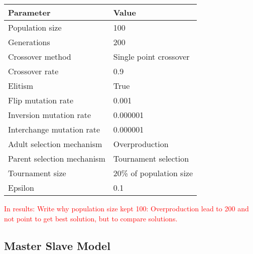 \begin{table}
\centering
\begin{tabular}{l|l}
\textbf{Parameter} & \textbf{Value} \\ 
\hline 
Population size & 100 \\  
Generations & 200 \\ 
Crossover method & Single point crossover \\ 
Crossover rate & 0.9 \\ 
Elitism & True \\ 
Flip mutation rate & 0.001 \\ 
Inversion mutation rate & 0.000001 \\ 
Interchange mutation rate & 0.000001 \\ 
Adult selection mechanism & Overproduction \\ 
Parent selection mechanism & Tournament selection \\ 
Tournament size & 20\% of population size\\ 
Epsilon & 0.1 \\ 
\end{tabular} 
\end{table}


\textcolor{red}{In results: Write why population size kept 100: Overproduction lead to 200 and not point to get best solution, but to compare solutions.}


\subsection{Master Slave Model}


